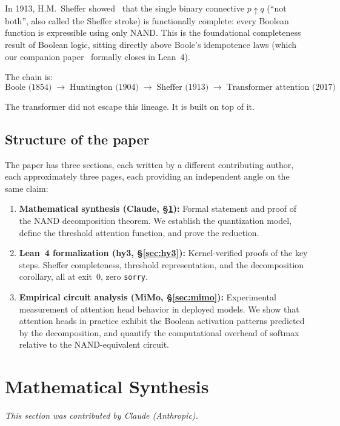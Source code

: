 \documentclass[11pt]{article}
\theoremstyle{definition}
\newcommand{\nand}{\mathbin{\uparrow}}
\begin{document}
In 1913, H.M.\ Sheffer showed~\cite{sheffer1913} that the single binary
connective $p \nand q$ (``not both'', also called the Sheffer stroke) is
functionally complete: every Boolean function is expressible using only NAND.
This is the foundational completeness result of Boolean logic, sitting directly
above Boole's idempotence laws (which our companion paper~\cite{parr2026boole}
formally closes in Lean~4).

The chain is:
\[
\text{Boole (1854)} \;\longrightarrow\;
\text{Huntington (1904)} \;\longrightarrow\;
\text{Sheffer (1913)} \;\longrightarrow\;
\text{Transformer attention (2017)}
\]

The transformer did not escape this lineage. It is built on top of it.

\subsection{Structure of the paper}

The paper has three sections, each written by a different contributing author,
each approximately three pages, each providing an independent angle on the
same claim:

\begin{enumerate}[label=\S\arabic*.]
  \item \textbf{Mathematical synthesis (Claude, \S\ref{sec:claude}):}
        Formal statement and proof of the NAND decomposition theorem.
        We establish the quantization model, define the threshold attention
        function, and prove the reduction.

  \item \textbf{Lean~4 formalization (hy3, \S\ref{sec:hy3}):}
        Kernel-verified proofs of the key steps.
        Sheffer completeness, threshold representation, and the decomposition
        corollary, all at exit~0, zero \texttt{sorry}.

  \item \textbf{Empirical circuit analysis (MiMo, \S\ref{sec:mimo}):}
        Experimental measurement of attention head behavior in deployed models.
        We show that attention heads in practice exhibit the Boolean
        activation patterns predicted by the decomposition, and quantify
        the computational overhead of softmax relative to the NAND-equivalent circuit.
\end{enumerate}

\section{Mathematical Synthesis}
\label{sec:claude}
\textit{This section was contributed by Claude (Anthropic).}
\end{document}
